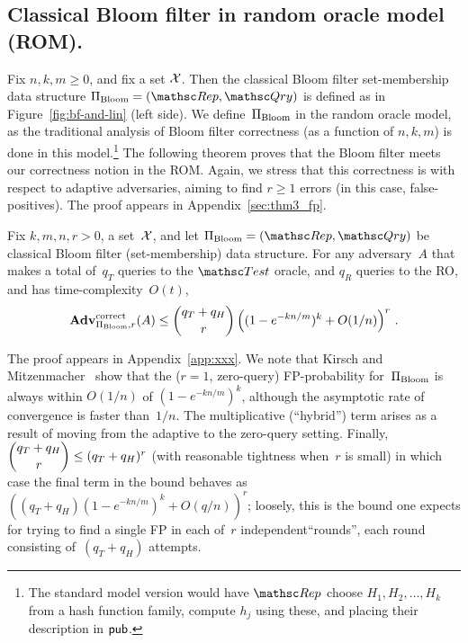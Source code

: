 \subsection{Classical Bloom filter in random oracle model (ROM). }

Fix $n,k,m \geq 0$, and fix a set ${\cal X}$.  Then the classical Bloom filter set-membership data structure $\setprim_{\mathrm{Bloom}}= (\Rep, \Qry)$ is defined as in Figure~\ref{fig:bf-and-lin} (left side).  We define~$\Pi_{\mathrm{Bloom}}$ in the random oracle model, as the traditional analysis of Bloom filter correctness (as a function of $n,k,m$) is done in this model.\footnote{The standard model version would have $\Rep$ choose $H_1,H_2,\ldots,H_k$ from a hash function family, compute $h_j$ using these, and placing their description in ${\sf pub}$.}  The following theorem proves that the Bloom filter meets our correctness notion in the ROM.  Again, we stress that this correctness is with respect to adaptive adversaries, aiming to find $r \geq 1$ errors (in this case, false-positives).
The proof appears in Appendix~\ref{sec:thm3_fp}.

\begin{theorem}\label{thm3}\label{thm:bf-correctness}
Fix $k,m,n,r>0$, a set~${\cal X}$, and let $\setprim_{\mathrm{Bloom}}= (\Rep, \Qry)$ be classical Bloom filter (set-membership) data structure. For any adversary~$A$ that makes a total of~$q_T$ queries to the $\Test$ oracle, and $q_R$ queries to the RO, and has time-complexity~$O(t)$,
\[
\mathrm{\mathbf{Adv}}^{\mathrm{correct}}_{\Pi_{\mathrm{Bloom}},r}(A) \leq  {\dbinom{q_T + q_H}{r}} \left( (1-e^{-kn/m})^k + O(1/n) \right)^r\,.
\]
\end{theorem}
The proof appears in Appendix~\ref{app:xxx}.  We note that Kirsch and Mitzenmacher~\cite{xxx} show
that the ($r=1$, zero-query) FP-probability for~$\Pi_\mathrm{Bloom}$ is
always within $O(1/n)$ of $(1-e^{-kn/m})^k$, although the asymptotic
rate of convergence is faster than~$1/n$.  The multiplicative (``hybrid'') term arises as a result
of moving from the adaptive to the zero-query setting.  
Finally, $\dbinom{q_T+q_H}{r} \leq (q_T+q_H)^r$ (with reasonable tightness when~$r$ is small) in 
which case the final term in the bound behaves as
$((q_T+q_H) (1-e^{-kn/m})^k + O(q/n) )^r$; loosely, this is the bound one expects for
trying to find a single FP in each of~$r$ independent``rounds'', each round
consisting of~$(q_T+q_H)$ attempts.
%


